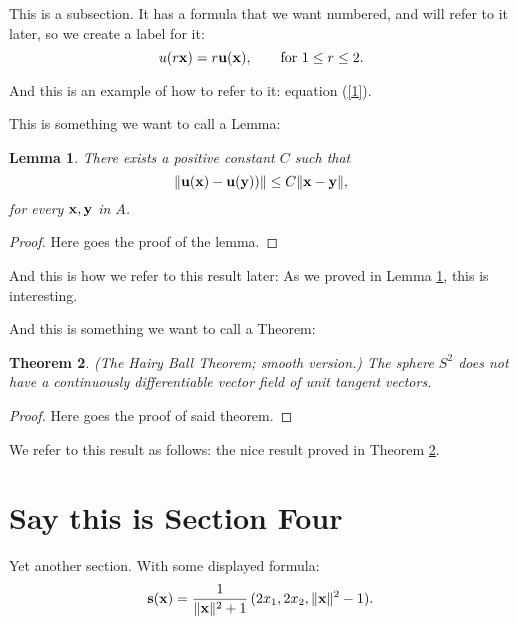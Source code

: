 \documentclass{amsart}
\newtheorem{theorem}{Theorem}[section]
\newtheorem{lemma}[theorem]{Lemma}
\theoremstyle{definition}
\numberwithin{equation}{section}
\def\ve#1{{\bf #1}}
\def\norm#1{\| {\bf #1} \|}
\def\norma#1{\| { #1} \|}
\begin{document}
\begin{sansmath}
This is a subsection.
It has a formula that we want numbered, and will refer to it later,
so we create a label for it:
    \begin{equation}
    \label{1}
    u(r \ve x) = r \ve u(\ve x) , \qquad \hbox{for $1 \le r \le 2$.}
    \end{equation}

And this is an example of how to refer to it: equation (\ref{1}).


This is something we want to call a Lemma:

\begin{lemma}
\label{lemma1}
    There exists a positive constant $C$ such that
    $$ \norma{\ve u(\ve x)  - \ve u  (\ve y))} \le C \norm{x-y} , $$
    for every $\ve x, \ve y$ in $A$.
\end{lemma}



\begin{proof}
Here goes the proof of the lemma.
\end{proof}

And this is how we refer to this result later:
As we proved in Lemma \ref{lemma1}, this is interesting.


\medskip

And this is something we want to call a Theorem:


\begin{theorem}
\label{hairy}
{\em(The Hairy Ball Theorem; smooth version.)}
    The sphere $S^2$ does not have a continuously differentiable vector field of unit tangent vectors.
\end{theorem}



\begin{proof}
  Here goes the proof of said theorem.
\end{proof}

We refer to this result as follows:
the nice result proved in Theorem \ref{hairy}.

\section{Say this is Section Four}

 Yet another section.
With some displayed formula:
    \begin{equation}
    \label{stereo}
       \ve s (\ve x) = {1 \over \norm{x}^2 + 1} \, (2 x_1, 2x_2, \norm{x}^2 - 1) .
    \end{equation}



\end{sansmath}
\end{document}
